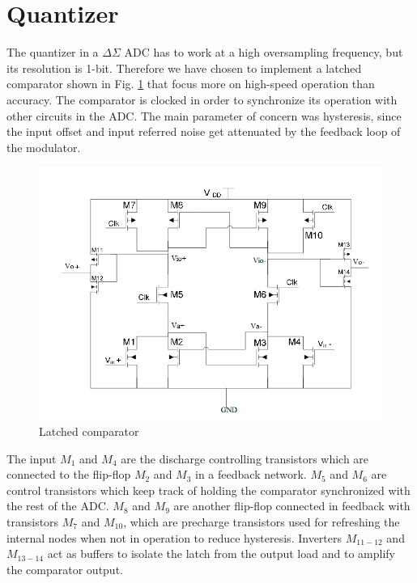 \section{Quantizer}

The quantizer in a $\Delta\Sigma$ ADC has to work at a high oversampling frequency, but its resolution is 1-bit. Therefore we have chosen to implement a latched comparator\cite{comparator} shown in Fig. \ref{quantizer} that focus more on high-speed operation than accuracy. The comparator is clocked in order to synchronize its operation with other circuits in the ADC. The main parameter of concern was  hysteresis, since the input offset and input referred noise get attenuated by the feedback loop of the modulator. 

\begin{figure}[h]
\centering
\includegraphics[scale = 0.7]{images/quatizier_circuit.png}
\caption{Latched comparator\cite{comparator}}
\label{quantizer}
\end{figure}

The input $M_1$ and $M_4$ are the discharge controlling transistors which are connected to the flip-flop $M_2$ and $M_3$ in a feedback network. $M_5$ and $M_6$ are control transistors which keep track of holding the comparator synchronized with the rest of the ADC. $M_8$ and $M_9$ are another flip-flop connected in feedback with transistors $M_7$ and $M_{10}$, which are precharge transistors used for refreshing the internal nodes when not in operation to reduce hysteresis. Inverters $M_{11-12}$ and $M_{13-14}$ act as buffers to isolate the latch from the output load and to amplify the comparator output.

